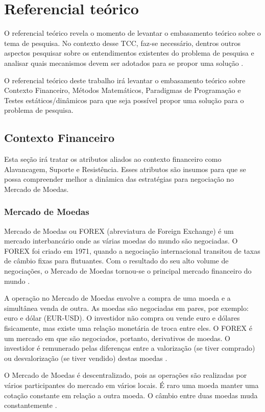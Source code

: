 \chapter{Referencial teórico}

O referencial teórico revela o momento de levantar o embasamento teórico sobre o tema de pesquisa. No contexto desse TCC, faz-se necessário, dentros outros aspectos pesquisar sobre os entendimentos existentes do problema de pesquisa e analisar quais mecanismos devem ser adotados para se propor uma solução \cite{belchior2012}.

O referencial teórico deste trabalho irá levantar o embasamento teórico sobre Contexto Financeiro, Métodos Matemáticos, Paradigmas de Programação e Testes estáticos/dinâmicos para que seja possível propor uma solução para o problema de pesquisa.

\section{Contexto Financeiro}
Esta seção irá tratar os atributos aliados ao contexto financeiro como Alavancagem, Suporte e Resistência. Esses atributos são insumos para que se possa compreender melhor a dinâmica das estratégias para negociação no Mercado de Moedas.

\subsection{Mercado de Moedas}
Mercado de Moedas ou FOREX (abreviatura de Foreign Exchange) é um mercado interbancário onde as várias moedas do mundo são negociadas. O FOREX foi criado em 1971, quando a negociação internacional transitou de taxas de câmbio fixas para flutuantes. Com o resultado do seu alto volume de negociações, o Mercado de Moedas tornou-se o principal mercado financeiro do mundo \cite{market2011}.

A operação no Mercado de Moedas envolve a compra de uma moeda e a simultânea venda de outra. As moedas são negociadas em pares, por exemplo: euro e dólar (EUR-USD). O investidor não compra ou vende euro e dólares fisicamente, mas existe uma relação monetária de troca entre eles. O FOREX é um mercado em que são negociados, portanto, derivativos de moedas. O investidor é remunerado pelas diferenças entre a valorização (se tiver comprado) ou desvalorização (se tiver vendido) destas moedas \cite[pág.~3]{cvm2009}.

O Mercado de Moedas é descentralizado, pois as operações são realizadas por vários participantes do mercado em vários locais. É raro uma moeda manter uma cotação constante em relação a outra moeda. O câmbio entre duas moedas muda constantemente \cite[pág.~5]{fxcm2011}.

